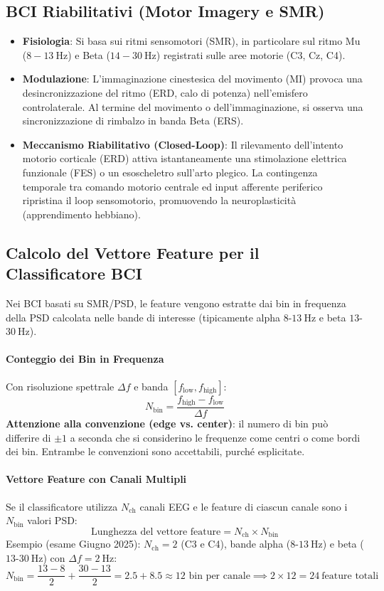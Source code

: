 \documentclass[10pt, letterpaper]{report}
\begin{document}
\subsection{BCI Riabilitativi (Motor Imagery e SMR)}
\begin{itemize}
    \item \textbf{Fisiologia}: Si basa sui ritmi sensomotori (SMR), in particolare sul ritmo Mu ($8-13\ \text{Hz}$) e Beta ($14-30\ \text{Hz}$) registrati sulle aree motorie (C3, Cz, C4).
    \item \textbf{Modulazione}: L'immaginazione cinestesica del movimento (MI) provoca una desincronizzazione del ritmo (ERD, calo di potenza) nell'emisfero controlaterale.
    Al termine del movimento o dell'immaginazione, si osserva una sincronizzazione di rimbalzo in banda Beta (ERS).
    \item \textbf{Meccanismo Riabilitativo (Closed-Loop)}: Il rilevamento dell'intento motorio corticale (ERD) attiva istantaneamente una stimolazione elettrica funzionale (FES) o un esoscheletro sull'arto plegico.
    La contingenza temporale tra comando motorio centrale ed input afferente periferico ripristina il loop sensomotorio, promuovendo la neuroplasticità (apprendimento hebbiano).
\end{itemize}

\subsection{Calcolo del Vettore Feature per il Classificatore BCI}
Nei BCI basati su SMR/PSD, le feature vengono estratte dai bin in frequenza della PSD calcolata nelle bande di interesse (tipicamente alpha $8$-$13\ \text{Hz}$ e beta $13$-$30\ \text{Hz}$).

\paragraph{Conteggio dei Bin in Frequenza}
Con risoluzione spettrale $\Delta f$ e banda $[f_{\text{low}}, f_{\text{high}}]$:
\[
N_{\text{bin}} = \frac{f_{\text{high}} - f_{\text{low}}}{\Delta f}
\]
\textbf{Attenzione alla convenzione (edge vs. center)}: il numero di bin può differire di $\pm 1$ a seconda che si considerino le frequenze come centri o come bordi dei bin. Entrambe le convenzioni sono accettabili, purché esplicitate.

\paragraph{Vettore Feature con Canali Multipli}
Se il classificatore utilizza $N_{\text{ch}}$ canali EEG e le feature di ciascun canale sono i $N_{\text{bin}}$ valori PSD:
\[
\text{Lunghezza del vettore feature} = N_{\text{ch}} \times N_{\text{bin}}
\]
Esempio (esame Giugno 2025): $N_{\text{ch}} = 2$ (C3 e C4), bande alpha ($8$-$13\ \text{Hz}$) e beta ($13$-$30\ \text{Hz}$) con $\Delta f = 2\ \text{Hz}$:
\[
N_{\text{bin}} = \frac{13-8}{2} + \frac{30-13}{2} = 2.5 + 8.5 \approx 12 \text{ bin per canale} \implies 2 \times 12 = 24\ \text{feature totali}
\]
\end{document}
